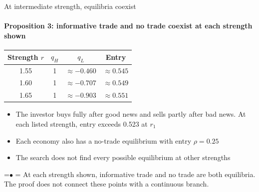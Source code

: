 \documentclass[10pt,aspectratio=169]{beamer}
\newcommand{\TakeawayBody}[1]{\begin{minipage}{\textwidth}\raggedright\normalsize
    \setbox0=\hbox{{\usebeamercolor[fg]{structure}\raise0.7pt\hbox{\scriptsize$\bullet$}}\hspace{0.55em}}%
    \hangindent=\wd0 \hangafter=1 \noindent\box0 #1\par
  \end{minipage}}
\renewcommand{\TakeawayWithNav}[2][\ExhibitReadingGap]{\par\vspace{#1}\noindent\TakeawayBody{#2}\par\vspace{0.45cm}}
\begin{document}
\begin{frame}[label=F12]{At intermediate strength, equilibria coexist}
\framesubtitle{Proposition 3: informative trade and no trade coexist at each strength shown}
\hypertarget{main:corr}{}
\vspace{4pt}
\begin{center}\small
\renewcommand{\arraystretch}{1.2}
\begin{tabular*}{0.92\textwidth}{@{\extracolsep{\fill}}cccc@{}}
\toprule
Strength $r$ & $q_H$ & $q_L$ & Entry\\
\midrule
1.55 %
 & 1 & $\approx-0.460$ %
 & $\approx0.545$\\ %
1.60 %
 & 1 & $\approx-0.707$ %
 & $\approx0.549$\\ %
1.65 %
 & 1 & $\approx-0.903$ %
 & $\approx0.551$\\ %
\bottomrule
\end{tabular*}
\end{center}
\vspace{-4pt}
\begin{itemize}\setlength{\itemsep}{3pt}
\item The investor buys fully after good news and sells partly after bad news. At each listed strength, entry exceeds 0.523 at $r_1$ %
\item Each economy also has a no-trade equilibrium with entry $\rho=0.25$ %
\item The search does not find every possible equilibrium at other strengths
\end{itemize}
\TakeawayWithNav{At each strength shown, informative trade and no trade are both equilibria. The proof does not connect these points with a continuous branch.}
\end{frame}
\end{document}
